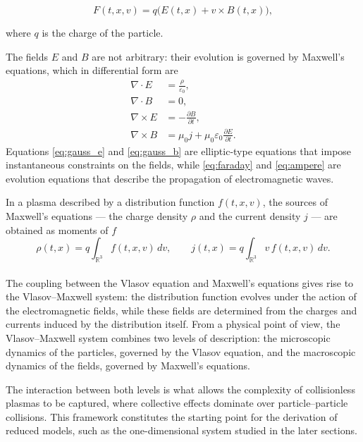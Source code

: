 \documentclass[11pt,a4paper,twoside,pdf]{article}
\numberwithin{equation}{section}
\begin{document}
\[
F(t,x,v) = q\big(E(t,x) + v \times B(t,x)\big),
\]


where $q$ is the charge of the particle.



The fields $E$ and $B$ are not arbitrary: their evolution is governed by
Maxwell's equations, which in differential form are
\begin{align}
\nabla \cdot E &= \frac{\rho}{\varepsilon_0}, \label{eq:gauss_e}\\
\nabla \cdot B &= 0, \label{eq:gauss_b}\\
\nabla \times E &= -\frac{\partial B}{\partial t}, \label{eq:faraday}\\
\nabla \times B &= \mu_0 j + \mu_0 \varepsilon_0 \frac{\partial E}{\partial t}. \label{eq:ampere}
\end{align}
Equations \eqref{eq:gauss_e} and \eqref{eq:gauss_b} are elliptic-type
equations that impose instantaneous constraints on the fields, while
\eqref{eq:faraday} and \eqref{eq:ampere} are evolution equations that describe the
propagation of electromagnetic waves.


In a plasma described by a distribution function $f(t,x,v)$, the sources of
Maxwell's equations --- the charge density $\rho$ and the current density $j$ ---
are obtained as moments of $f$
\begin{equation}
\rho(t,x) = q \int_{\mathbb{R}^3} f(t,x,v)\,dv,
\qquad
j(t,x) = q \int_{\mathbb{R}^3} v\, f(t,x,v)\,dv.
\label{eq:rho_J}
\end{equation}
\\


\newpage
The coupling between the Vlasov equation and Maxwell's equations gives rise to the
Vlasov--Maxwell system: the distribution function evolves under the action of the electromagnetic
fields, while these fields are determined from the charges and
currents induced by the distribution itself. From a physical point of view, the Vlasov--Maxwell system combines two levels of
description: the microscopic dynamics of the particles, governed by the Vlasov equation, and the macroscopic dynamics of the fields, governed by Maxwell's equations.\newline

The interaction between both levels is what allows the complexity of
collisionless plasmas to be captured, where collective effects dominate over
particle--particle collisions. This framework constitutes the starting point for the derivation of
reduced models, such as the one-dimensional system studied in the later
sections.
\end{document}
